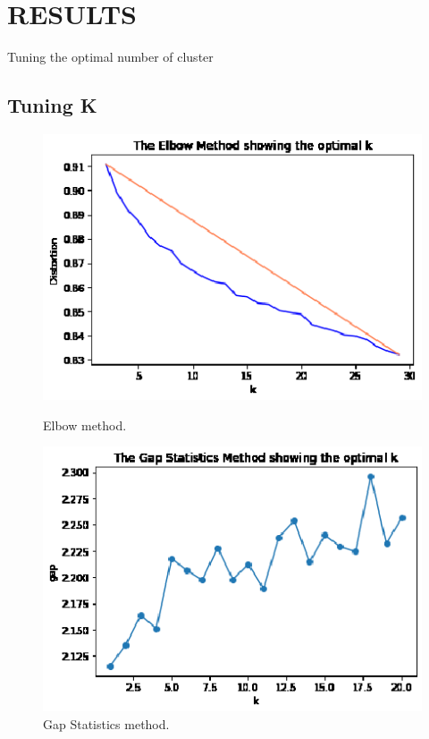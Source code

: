 \documentclass[9pt]{beamer}
\begin{document}
\section{RESULTS}
\begin{frame}{Tuning the optimal number of cluster}

\subsection{Tuning K}
\begin{figure}
  \centering
  \begin{minipage}[b]{0.4\textwidth}
    \includegraphics[width=1\columnwidth]{2.eps}
    \caption{ Elbow method.}
  \end{minipage}
  \hfill
  \begin{minipage}[b]{0.4\textwidth}
    \includegraphics[width=1\columnwidth]{3Gap.eps}
    \caption{ Gap Statistics method.\label{2}}
  \end{minipage}
\end{figure}


\end{frame}
\end{document}

